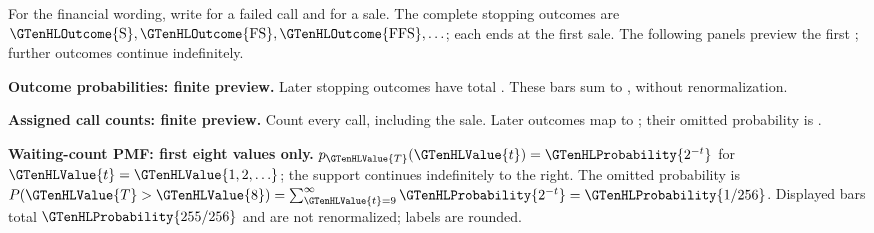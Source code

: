\noindent For the financial wording, write  for a failed call and  for a sale. The complete stopping outcomes are $\GTenHLOutcome{\mathrm{S}},\GTenHLOutcome{\mathrm{FS}},\GTenHLOutcome{\mathrm{FFS}},\ldots$; each ends at the first sale. The following panels preview the first ; further outcomes continue indefinitely.\par\medskip
\Needspace{6.8cm}
\par\noindent \begin{minipage}[t]{.485\linewidth}
\centering
{}
\par\small \textbf{Outcome probabilities: finite preview.} Later stopping outcomes have total . These bars sum to , without renormalization.
\end{minipage}\hfill
\begin{minipage}[t]{.485\linewidth}
\centering
{}
\par\small \textbf{Assigned call counts: finite preview.} Count every call, including the sale. Later outcomes map to ; their omitted probability is .
\end{minipage}\par\medskip

\Needspace{6.8cm}
\par\noindent \begin{minipage}[t]{.98\linewidth}
\centering
{}
\par\small \textbf{Waiting-count PMF: first eight values only.} $p_{\GTenHLValue{T}}(\GTenHLValue{t})=\GTenHLProbability{2^{-t}}$ for $\GTenHLValue{t}=\GTenHLValue{1,2,\ldots}$; the support continues indefinitely to the right. The omitted probability is $P(\GTenHLValue{T}>\GTenHLValue{8})=\sum_{\GTenHLValue{t}=9}^{\infty}\GTenHLProbability{2^{-t}}=\GTenHLProbability{1/256}$. Displayed bars total $\GTenHLProbability{255/256}$ and are not renormalized; labels are rounded.
\end{minipage}\par\medskip

